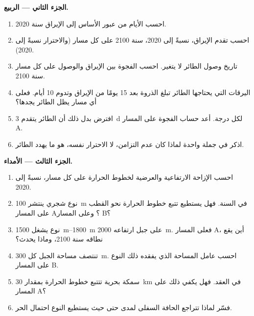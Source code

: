\begin{problem}
\medskip
\noindent\textbf{الجزء الثاني --- الربيع.}
\begin{enumerate}[resume]
  \item احسب الأيام من عبور الأساس إلى الإيراق سنة 2020.
  \item احسب تقدم الإيراق، نسبةً إلى 2020، سنة 2100
        على كل مسار (والاحترار نسبةً إلى 2020).
  \item تاريخ وصول الطائر لا يتغير. احسب الفجوة
        بين الإيراق والوصول على كل مسار سنة 2100.
  \item اليرقات التي يحتاجها الطائر تبلغ الذروة بعد 15 يومًا من الإيراق
        وتدوم 10 أيام. فعلى أي مسار يظل الطائر يجدها؟
  \item افترض بدل ذلك أن الطائر يتقدم \qty{3}{d} لكل
        درجة. أعد حساب الفجوة على المسار A.
  \item اذكر في جملة واحدة لماذا كان عدم التزامن، لا الاحترار
        نفسه، هو ما يهدد الطائر.
\end{enumerate}

\medskip
\noindent\textbf{الجزء الثالث --- الأمداء.}
\begin{enumerate}[resume]
  \item احسب الإزاحة الارتفاعية والعرضية
        لخطوط الحرارة على كل مسار، نسبةً إلى 2020.
  \item نوع شجري ينتشر \qty{100}{m} في السنة. فهل يستطيع تتبع
        خطوط الحرارة نحو القطب على المسار A؟ وعلى المسار B؟
  \item نوع يشغل \qtyrange{1500}{1800}{m} على جبل ارتفاعه
        \qty{2000}{m}. فعلى المسار A، أين يقع نطاقه
        سنة 2100، وماذا يحدث؟
  \item تنتصف مساحة الجبل كل \qty{300}{m}. احسب
        عامل المساحة الذي يفقده ذلك النوع على المسار B.
  \item سمكة بحرية تتتبع خطوط الحرارة بمقدار \qty{30}{km} في العقد.
        فهل يكفي ذلك على المسار A؟
  \item فسّر لماذا تتراجع الحافة السفلى لمدى حتى حيث
        يستطيع النوع احتمال الحر.
\end{enumerate}


\end{problem}
